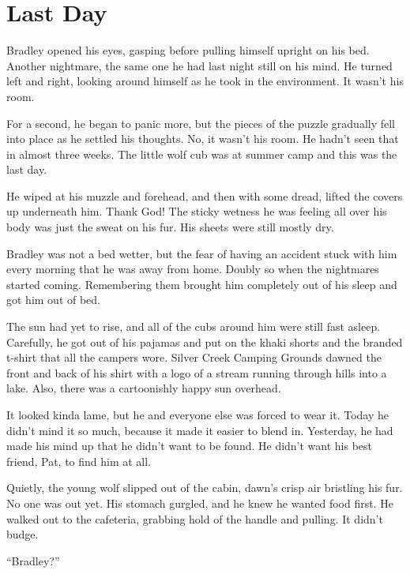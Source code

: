 
\chapter*{Last Day}

Bradley opened his eyes, gasping before pulling himself upright on his
bed. Another nightmare, the same one he had last night still on his
mind. He turned left and right, looking around himself as he took in the
environment. It wasn't his room.

For a second, he began to panic more, but the pieces of the puzzle
gradually fell into place as he settled his thoughts. No, it wasn't his
room. He hadn't seen that in almost three weeks. The little wolf cub was
at summer camp and this was the last day.

He wiped at his muzzle and forehead, and then with some dread, lifted
the covers up underneath him. Thank God! The sticky wetness he was
feeling all over his body was just the sweat on his fur. His sheets were
still mostly dry.

Bradley was not a bed wetter, but the fear of having an accident stuck
with him every morning that he was away from home. Doubly so when the
nightmares started coming. Remembering them brought him completely out
of his sleep and got him out of bed.

The sun had yet to rise, and all of the cubs around him were still fast
asleep. Carefully, he got out of his pajamas and put on the khaki shorts
and the branded t-shirt that all the campers wore. Silver Creek Camping
Grounds dawned the front and back of his shirt with a logo of a stream
running through hills into a lake. Also, there was a cartoonishly happy
sun overhead.

It looked kinda lame, but he and everyone else was forced to wear it.
Today he didn't mind it so much, because it made it easier to blend in.
Yesterday, he had made his mind up that he didn't want to be found. He
didn't want his best friend, Pat, to find him at all.

Quietly, the young wolf slipped out of the cabin, dawn's crisp air
bristling his fur. No one was out yet. His stomach gurgled, and he knew
he wanted food first. He walked out to the cafeteria, grabbing hold of
the handle and pulling. It didn't budge.

``Bradley?''

